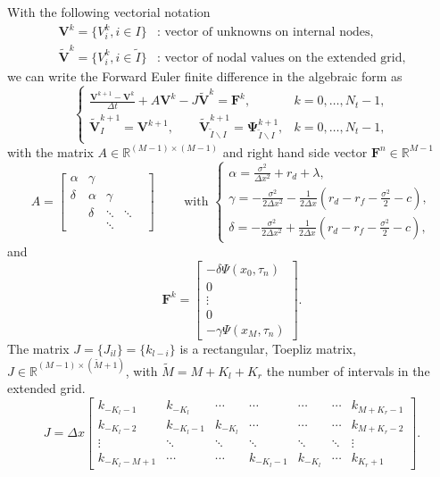 With the following vectorial notation 
\begin{align*}
\mathbf{V}^k = \{V_i^k, i \in I\} & \text{: vector of unknowns on internal nodes},\\
\mathbf{\tilde{V}}^k = \{V_i^k, i \in \tilde{I}\}& \text{: vector of nodal values on the extended grid},
\end{align*}
we can write the Forward Euler finite difference in the algebraic form as
$$\begin{cases}
\displaystyle{\frac{\mathbf{V}^{k+1}-\mathbf{V}^k}{\Delta t}+ A\mathbf{V}^k-J\mathbf{\tilde{V}}^k = \mathbf{F}^k},&k = 0,\ldots, N_t-1,\\
\mathbf{\tilde{V}}_I^{k+1} = \mathbf{V}^{k+1},\qquad \mathbf{\tilde{V}}_{\tilde{I}\backslash I}^{k+1}=\mathbf{\Psi}_{\tilde{I}\backslash I}^{k+1}, &k = 0,\ldots, N_t-1,
\end{cases}$$
with the matrix $A\in\mathbb{R}^{(M-1)\times(M-1)}$ and right hand side vector $\mathbf{F}^n\in\mathbb{R}^{M-1}$
$$ A = \left[\begin{matrix} 
\alpha & \gamma & & &\\
\delta & \alpha & \gamma & & \\
& \delta & \ddots & \ddots \\
& & \ddots & & 
\end{matrix}\right]
\qquad\text{ with }
\begin{cases}
\alpha = \frac{\sigma^2}{\Delta x^2}+r_d +\lambda,\\
\gamma = -\frac{\sigma^2}{2\Delta x^2}-\frac{1}{2\Delta x}\left(r_d-r_f-\frac{\sigma^2}{2}-c\right),\\
\delta = -\frac{\sigma^2}{2\Delta x^2}+\frac{1}{2\Delta x}\left(r_d-r_f-\frac{\sigma^2}{2}-c\right),
\end{cases}$$
and
$$\mathbf{F}^k = \left[\begin{matrix}
-\delta \Psi(x_0, \tau_n)\\
0\\
\vdots\\
0\\
-\gamma\Psi(x_M,\tau_n)
\end{matrix}\right].$$
The matrix $J=\{J_{il}\}=\{k_{l-i}\}$ is a rectangular, Toepliz matrix, $J\in\mathbb{R}^{(M-1)\times(\tilde{M}+1)}$, with $\tilde{M}=M+K_l+K_r$ the number of intervals in the extended grid.
$$J = \Delta x \left[
\begin{matrix}
k_{-K_l-1} & k_{-K_l} & \cdots & \cdots &\cdots &\cdots & k_{M+K_r-1}\\
k_{-K_l-2} & k_{-K_l-1} & k_{-K_l} &\cdots &\cdots &\cdots & k_{M+K_r-2}\\
\vdots & \ddots &\ddots &\ddots &\ddots & \ddots & \vdots\\
k_{-K_l-M+1} & \cdots & \cdots & k_{-K_l-1} & k_{-K_l} &\cdots & k_{K_r+1}
\end{matrix}
\right].$$

